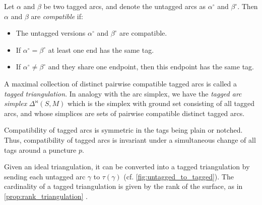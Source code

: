 \begin{definition}

	Let $\alpha$ and $\beta$ be two tagged arcs, and denote the untagged arcs as
	$\alpha^\circ$ and $\beta^\circ$. Then $\alpha$ and $\beta$ are
	\emph{compatible} if:
	\begin{itemize}
		\item The untagged versions $\alpha^\circ$ and $\beta^\circ$ are compatible.
		\item If $\alpha^\circ = \beta^\circ$ at least one end has the same tag.
		\item If $\alpha^\circ \neq \beta^\circ$ and they share one endpoint, then this endpoint has
		      the same tag.
	\end{itemize}

	A maximal collection of distinct pairwise compatible tagged arcs is called a
	\emph{tagged triangulation}. In analogy with the arc
	simplex, we have the \emph{tagged arc simplex}
	$\Delta^{\bowtie}(S,M)$ which is the
	simplex with ground set consisting of all tagged arcs, and whose simplices are sets of
	pairwise compatible distinct tagged arcs.
\end{definition}

\begin{remark}\label{rem:change_tags_puncture}

	Compatibility of tagged arcs is symmetric in the tags being plain or notched. Thus,
	compatibility of tagged arcs is invariant under a simultaneous change of all tags
	around a puncture $p$.
\end{remark}

Given an ideal triangulation, it can be converted into a tagged triangulation by
sending each untagged arc $\gamma$ to $\tau(\gamma)$ (cf.
\cref{fig:untagged_to_tagged}). The cardinality of a tagged triangulation is given by
the rank of the surface, as in \cref{prop:rank_triangulation} \parencite[Theorem 7.9]{FominShapiroThurston2008CATriangulatedSurfacesI}.

